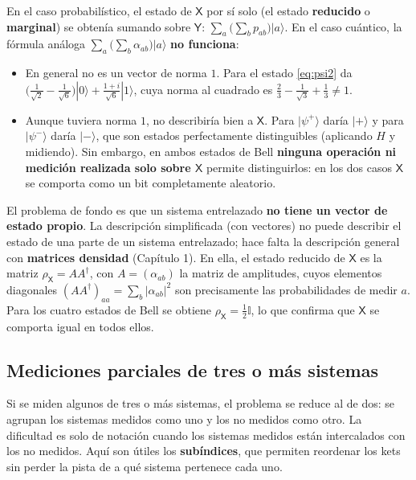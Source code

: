 \documentclass[11pt, a4paper, twoside, openright]{report}
\begin{document}
\begin{tcolorbox}[colback=blue!5!white,colframe=blue!75!black,title=\textbf{Nota Aclaratoria: El problema de los estados reducidos}]
En el caso probabilístico, el estado de $\mathsf{X}$ por sí solo (el estado \textbf{reducido} o \textbf{marginal}) se obtenía sumando sobre $\mathsf{Y}$: $\sum_a\big(\sum_b p_{ab}\big)|a\rangle$. En el caso cuántico, la fórmula análoga $\sum_a\big(\sum_b\alpha_{ab}\big)|a\rangle$ \textbf{no funciona}:
\begin{itemize}
    \item En general no es un vector de norma $1$. Para el estado \eqref{eq:psi2} da $\big(\frac{1}{\sqrt2} - \frac{1}{\sqrt6}\big)|0\rangle + \frac{1+i}{\sqrt6}|1\rangle$, cuya norma al cuadrado es $\frac23 - \frac{1}{\sqrt3} + \frac13 \neq 1$.
    \item Aunque tuviera norma $1$, no describiría bien a $\mathsf{X}$. Para $|\psi^+\rangle$ daría $|+\rangle$ y para $|\psi^-\rangle$ daría $|-\rangle$, que son estados perfectamente distinguibles (aplicando $H$ y midiendo). Sin embargo, en ambos estados de Bell \textbf{ninguna operación ni medición realizada solo sobre $\mathsf{X}$} permite distinguirlos: en los dos casos $\mathsf{X}$ se comporta como un bit completamente aleatorio.
\end{itemize}
El problema de fondo es que un sistema entrelazado \textbf{no tiene un vector de estado propio}. La descripción simplificada (con vectores) no puede describir el estado de una parte de un sistema entrelazado; hace falta la descripción general con \textbf{matrices densidad} (Capítulo 1). En ella, el estado reducido de $\mathsf{X}$ es la matriz $\rho_{\mathsf{X}} = A A^\dagger$, con $A = (\alpha_{ab})$ la matriz de amplitudes, cuyos elementos diagonales $(AA^\dagger)_{aa} = \sum_b|\alpha_{ab}|^2$ son precisamente las probabilidades de medir $a$. Para los cuatro estados de Bell se obtiene $\rho_{\mathsf{X}} = \frac12\mathbb{I}$, lo que confirma que $\mathsf{X}$ se comporta igual en todos ellos.
\end{tcolorbox}

\subsection{Mediciones parciales de tres o más sistemas}

\noindent Si se miden algunos de tres o más sistemas, el problema se reduce al de dos: se agrupan los sistemas medidos como uno y los no medidos como otro. La dificultad es solo de notación cuando los sistemas medidos están intercalados con los no medidos. Aquí son útiles los \textbf{subíndices}, que permiten reordenar los kets sin perder la pista de a qué sistema pertenece cada uno.
\end{document}
